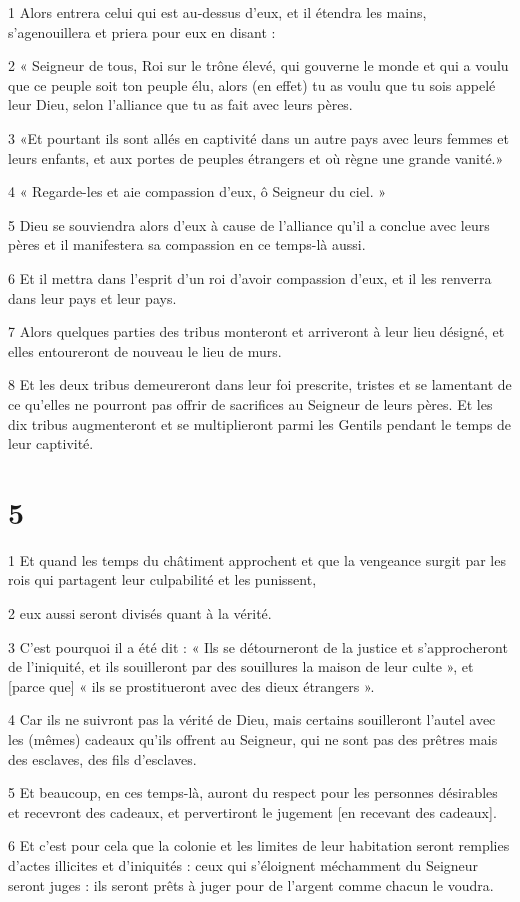 \par 1 Alors entrera celui qui est au-dessus d'eux, et il étendra les mains, s'agenouillera et priera pour eux en disant :
\par 2 « Seigneur de tous, Roi sur le trône élevé, qui gouverne le monde et qui a voulu que ce peuple soit ton peuple élu, alors (en effet) tu as voulu que tu sois appelé leur Dieu, selon l'alliance que tu as fait avec leurs pères.
\par 3 «Et pourtant ils sont allés en captivité dans un autre pays avec leurs femmes et leurs enfants, et aux portes de peuples étrangers et où règne une grande vanité.»
\par 4 « Regarde-les et aie compassion d'eux, ô Seigneur du ciel. »
\par 5 Dieu se souviendra alors d'eux à cause de l'alliance qu'il a conclue avec leurs pères et il manifestera sa compassion en ce temps-là aussi.
\par 6 Et il mettra dans l'esprit d'un roi d'avoir compassion d'eux, et il les renverra dans leur pays et leur pays.
\par 7 Alors quelques parties des tribus monteront et arriveront à leur lieu désigné, et elles entoureront de nouveau le lieu de murs.
\par 8 Et les deux tribus demeureront dans leur foi prescrite, tristes et se lamentant de ce qu'elles ne pourront pas offrir de sacrifices au Seigneur de leurs pères. Et les dix tribus augmenteront et se multiplieront parmi les Gentils pendant le temps de leur captivité.

\chapter{5}

\par 1 Et quand les temps du châtiment approchent et que la vengeance surgit par les rois qui partagent leur culpabilité et les punissent,
\par 2 eux aussi seront divisés quant à la vérité.
\par 3 C'est pourquoi il a été dit : « Ils se détourneront de la justice et s'approcheront de l'iniquité, et ils souilleront par des souillures la maison de leur culte », et [parce que] « ils se prostitueront avec des dieux étrangers ».
\par 4 Car ils ne suivront pas la vérité de Dieu, mais certains souilleront l'autel avec les (mêmes) cadeaux qu'ils offrent au Seigneur, qui ne sont pas des prêtres mais des esclaves, des fils d'esclaves.
\par 5 Et beaucoup, en ces temps-là, auront du respect pour les personnes désirables et recevront des cadeaux, et pervertiront le jugement [en recevant des cadeaux].
\par 6 Et c'est pour cela que la colonie et les limites de leur habitation seront remplies d'actes illicites et d'iniquités : ceux qui s'éloignent méchamment du Seigneur seront juges : ils seront prêts à juger pour de l'argent comme chacun le voudra.

